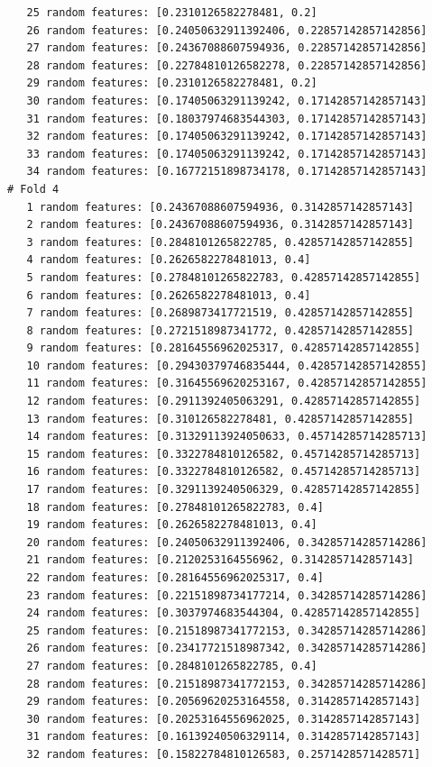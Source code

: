 \documentclass[12pt]{amsart}
\begin{document}
\begin{verbatim}
   25 random features: [0.2310126582278481, 0.2]
   26 random features: [0.24050632911392406, 0.22857142857142856]
   27 random features: [0.24367088607594936, 0.22857142857142856]
   28 random features: [0.22784810126582278, 0.22857142857142856]
   29 random features: [0.2310126582278481, 0.2]
   30 random features: [0.17405063291139242, 0.17142857142857143]
   31 random features: [0.18037974683544303, 0.17142857142857143]
   32 random features: [0.17405063291139242, 0.17142857142857143]
   33 random features: [0.17405063291139242, 0.17142857142857143]
   34 random features: [0.16772151898734178, 0.17142857142857143]
# Fold 4
   1 random features: [0.24367088607594936, 0.3142857142857143]
   2 random features: [0.24367088607594936, 0.3142857142857143]
   3 random features: [0.2848101265822785, 0.42857142857142855]
   4 random features: [0.2626582278481013, 0.4]
   5 random features: [0.27848101265822783, 0.42857142857142855]
   6 random features: [0.2626582278481013, 0.4]
   7 random features: [0.2689873417721519, 0.42857142857142855]
   8 random features: [0.2721518987341772, 0.42857142857142855]
   9 random features: [0.28164556962025317, 0.42857142857142855]
   10 random features: [0.29430379746835444, 0.42857142857142855]
   11 random features: [0.31645569620253167, 0.42857142857142855]
   12 random features: [0.2911392405063291, 0.42857142857142855]
   13 random features: [0.310126582278481, 0.42857142857142855]
   14 random features: [0.31329113924050633, 0.45714285714285713]
   15 random features: [0.3322784810126582, 0.45714285714285713]
   16 random features: [0.3322784810126582, 0.45714285714285713]
   17 random features: [0.3291139240506329, 0.42857142857142855]
   18 random features: [0.27848101265822783, 0.4]
   19 random features: [0.2626582278481013, 0.4]
   20 random features: [0.24050632911392406, 0.34285714285714286]
   21 random features: [0.2120253164556962, 0.3142857142857143]
   22 random features: [0.28164556962025317, 0.4]
   23 random features: [0.22151898734177214, 0.34285714285714286]
   24 random features: [0.3037974683544304, 0.42857142857142855]
   25 random features: [0.21518987341772153, 0.34285714285714286]
   26 random features: [0.23417721518987342, 0.34285714285714286]
   27 random features: [0.2848101265822785, 0.4]
   28 random features: [0.21518987341772153, 0.34285714285714286]
   29 random features: [0.20569620253164558, 0.3142857142857143]
   30 random features: [0.20253164556962025, 0.3142857142857143]
   31 random features: [0.16139240506329114, 0.3142857142857143]
   32 random features: [0.15822784810126583, 0.2571428571428571]

\end{verbatim}
\end{document}
